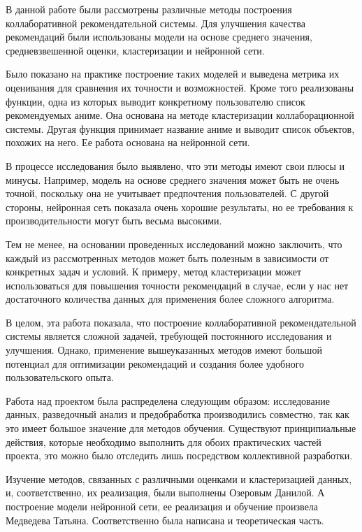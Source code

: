 \documentclass[bachelor, och, diploma]{SCWorks}
\begin{document}
\conclusion
В данной работе были рассмотрены различные методы построения коллаборативной рекомендательной системы.
 Для улучшения качества рекомендаций были использованы модели на основе среднего значения,
  средневзвешенной оценки, кластеризации и нейронной сети.

Было показано на практике построение таких моделей и выведена метрика их оценивания для
 сравнения их точности и возможностей. Кроме того реализованы функции, одна из которых
  выводит конкретному пользователю список рекомендуемых аниме. Она основана 
  на методе кластеризации коллаборационной системы. Другая функция принимает название аниме
   и выводит список объектов, похожих на него. Ее работа основана на нейронной сети.

В процессе исследования было выявлено, что эти методы имеют свои плюсы и минусы.
 Например, модель на основе среднего значения может быть не очень точной, поскольку
  она не учитывает предпочтения пользователей. С другой стороны, нейронная сеть показала очень
   хорошие результаты, но ее требования к производительности могут быть весьма высокими.

Тем не менее, на основании проведенных исследований можно заключить, что каждый из рассмотренных
 методов может быть полезным в зависимости от конкретных задач и условий. К примеру,
  метод кластеризации может использоваться для повышения точности рекомендаций в случае,
   если у нас нет достаточного количества данных для применения более сложного алгоритма.

В целом, эта работа показала, что построение коллаборативной рекомендательной системы 
является сложной задачей, требующей постоянного исследования и улучшения. Однако, 
применение вышеуказанных методов имеют большой потенциал для оптимизации рекомендаций и создания 
более удобного пользовательского опыта.

Работа над проектом была распределена следующим образом: 
исследование данных, разведочный анализ и предобработка производились совместно,
 так как это имеет большое значение для методов обучения. Существуют принципиальные действия,
  которые необходимо выполнить для обоих практических частей проекта, это можно было отследить
   лишь посредством коллективной разработки.

Изучение методов, связанных с различными оценками и кластеризацией данных,
 и, соответственно, их реализация, были выполнены Озеровым Данилой.
  А построение модели нейронной сети, ее реализация и обучение произвела Медведева Татьяна.
   Соответственно была написана и теоретическая часть.
\end{document}
